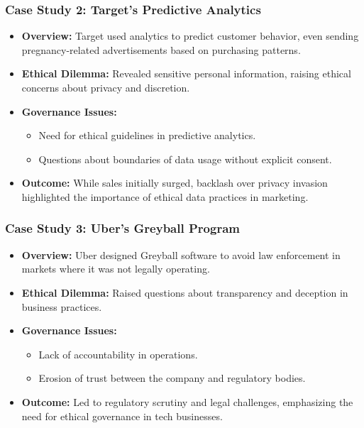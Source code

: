 \documentclass[aspectratio=169]{beamer}
\begin{document}
\begin{frame}[fragile]
  \frametitle{Case Study 2: Target's Predictive Analytics}
  \begin{itemize}
    \item \textbf{Overview:} Target used analytics to predict customer behavior, even sending pregnancy-related advertisements based on purchasing patterns.
    
    \item \textbf{Ethical Dilemma:} Revealed sensitive personal information, raising ethical concerns about privacy and discretion.
    
    \item \textbf{Governance Issues:}
      \begin{itemize}
        \item Need for ethical guidelines in predictive analytics.
        \item Questions about boundaries of data usage without explicit consent.
      \end{itemize}
    
    \item \textbf{Outcome:} While sales initially surged, backlash over privacy invasion highlighted the importance of ethical data practices in marketing.
  \end{itemize}
\end{frame}

\begin{frame}[fragile]
  \frametitle{Case Study 3: Uber's Greyball Program}
  \begin{itemize}
    \item \textbf{Overview:} Uber designed Greyball software to avoid law enforcement in markets where it was not legally operating.
    
    \item \textbf{Ethical Dilemma:} Raised questions about transparency and deception in business practices.
    
    \item \textbf{Governance Issues:}
      \begin{itemize}
        \item Lack of accountability in operations.
        \item Erosion of trust between the company and regulatory bodies.
      \end{itemize}
    
    \item \textbf{Outcome:} Led to regulatory scrutiny and legal challenges, emphasizing the need for ethical governance in tech businesses.
  \end{itemize}
\end{frame}
\end{document}
